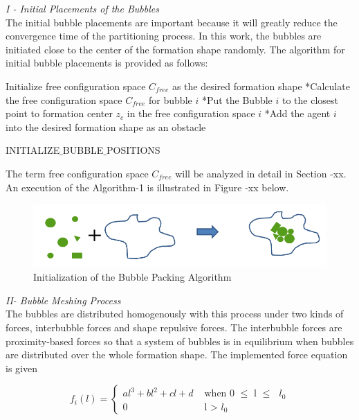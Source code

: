 \textit{			I - Initial Placements of the Bubbles} \\ 
The initial bubble placements are important because it will greatly reduce the convergence time of the partitioning process. In this work, the bubbles are initiated close to the center of the formation shape randomly. The algorithm for initial bubble placements is provided as follows:
			
\begin{algorithm}[H]
Initialize free configuration space $C_{free}$ as the desired formation shape
{		
*Calculate the free configuration space $C_{free}$ for bubble $i$\;
*Put the Bubble $i$ to the closest point to  formation center  $z_c$  in the free configuration space $i$ \;
*Add the agent $i$ into the desired formation shape as an obstacle \;
}
				
\caption{INITIALIZE$\_$BUBBLE$\_$POSITIONS}
\end{algorithm}
		
The term free configuration space $C_{free}$ will be analyzed in detail in Section -xx. An execution of the Algorithm-1 is illustrated in Figure -xx below.
		
\begin{figure}[H]
\caption{Initialization of the Bubble Packing Algorithm}
\centering
\includegraphics[scale = 0.50]{bubble_packing}
\end{figure}
				
\textit{			II- Bubble Meshing Process } \\ 
The bubbles are distributed homogenously with this process under two kinds of forces, interbubble forces and shape repulsive forces. The interbubble forces are proximity-based forces so that a system of bubbles is in equilibrium when bubbles are distributed over the whole formation shape. The implemented force equation is given
		
\begin{equation}
f_i(l) = \left\{ \begin{array}{rl}
al^3 + bl^2 + cl + d &\mbox{ when 0 $\leq$ l $\leq$ $l_0$} \\
0                               &\mbox{ l > $l_0$}
\end{array} \right.
\end{equation}

